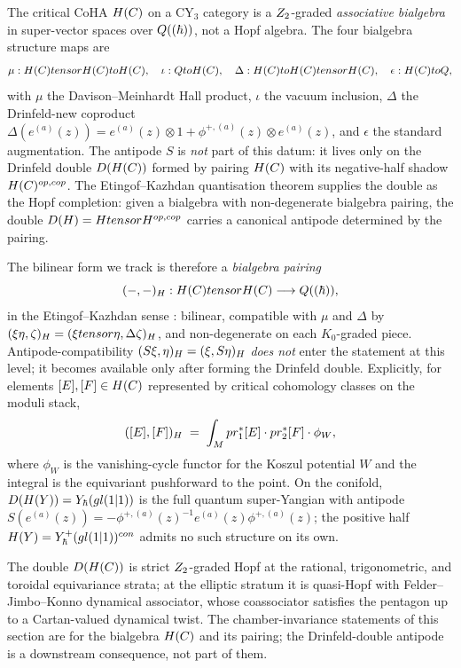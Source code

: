 The critical CoHA $H(C)$ on a CY$_3$ category is a $Z_2$-graded
\emph{associative bialgebra} in super-vector spaces over $Q((\hbar))$, not
a Hopf algebra. The four bialgebra structure maps are
\[
  \mu : H(C) tensor H(C) to H(C),
  \quad
  \iota : Q to H(C),
  \quad
  \Delta : H(C) to H(C) tensor H(C),
  \quad
  \epsilon : H(C) to Q,
\]
with $\mu$ the Davison--Meinhardt Hall product, $\iota$ the vacuum inclusion,
$\Delta$ the Drinfeld-new coproduct
$\Delta(e^{(a)}(z)) = e^{(a)}(z) \otimes 1 + \phi^{+,(a)}(z) \otimes e^{(a)}(z)$,
and $\epsilon$ the standard augmentation. The antipode $S$ is \emph{not}
part of this datum: it lives only on the Drinfeld double $D(H(C))$
formed by pairing $H(C)$ with its negative-half shadow
$H(C)^{op, cop}$. The Etingof--Kazhdan quantisation theorem
\cite{EtingofKazhdan1996} supplies the double as the Hopf completion:
given a bialgebra with non-degenerate bialgebra pairing, the double
$D(H) = H tensor H^{op,cop}$ carries a canonical antipode
determined by the pairing.

The bilinear form we track is therefore a \emph{bialgebra pairing}
\[
  (-, -)_{H} : H(C) tensor H(C) \longrightarrow Q((\hbar)),
\]
in the Etingof--Kazhdan sense \cite[\S 3]{EtingofKazhdan1996}: bilinear,
compatible with $\mu$ and $\Delta$ by
$(\xi \eta, \zeta)_{H} = (\xi tensor \eta, \Delta \zeta)_{H}$, and
non-degenerate on each $K_0$-graded piece. Antipode-compatibility
$(S\xi, \eta)_{H} = (\xi, S\eta)_{H}$ \emph{does not} enter the statement
at this level; it becomes available only after forming the Drinfeld
double. Explicitly, for elements $[E], [F] \in H(C)$ represented by
critical cohomology classes on the moduli stack,
\[
  ([E], [F])_{H} \;=\; \int_{M} pr_1^*[E] \cdot pr_2^*[F] \cdot \phi_W,
\]
where $\phi_W$ is the vanishing-cycle functor for the Koszul potential
$W$ and the integral is the equivariant pushforward to the point. On the
conifold, $D(H(Y)) = Y_{\hbar}(gl(1|1))$ is
the full quantum super-Yangian with antipode
$S(e^{(a)}(z)) = -\phi^{+,(a)}(z)^{-1} e^{(a)}(z) \phi^{+,(a)}(z)$; the
positive half
$H(Y) = Y^+_{\hbar}(gl(1|1))^{con}$
admits no such structure on its own.

\begin{remark}
  \label{rem:hopf-status-stratified}
  The double $D(H(C))$ is strict $Z_2$-graded Hopf at the rational,
  trigonometric, and toroidal equivariance strata; at the elliptic
  stratum it is quasi-Hopf with Felder--Jimbo--Konno dynamical associator,
  whose coassociator satisfies the pentagon up to a Cartan-valued
  dynamical twist. The chamber-invariance statements of this section
  are for the bialgebra $H(C)$ and its pairing; the Drinfeld-double
  antipode is a downstream consequence, not part of them.
\end{remark}


